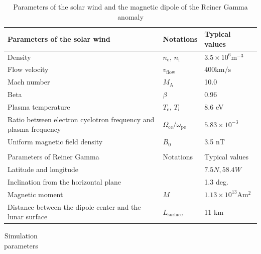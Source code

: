 \documentclass[draft,jgrga]{agutex2015}
\begin{document}
\begin{article}
\begin{table}[h]
\caption{Parameters of the solar wind and the magnetic dipole of the Reiner Gamma anomaly}
\centering
 \begin{tabular}{p{}ll}
 Parameters of the solar wind    &  Notations    &  Typical values \\  \hline           
 Density       & $n_\mathrm{e}$, $n_\mathrm{i}$  &  $3.5 \times 10^6 \mathrm{m^{-3}}$   \\ 
 Flow velocity & $v_\mathrm{flow}$               &  $400  \mathrm{km/s}  $              \\
 Mach number   & $M_\mathrm{A}$                  & 10.0 \\
 Beta          &  $\beta$                        & 0.96 \\
 Plasma temperature & $T_\mathrm{e}$, $T_\mathrm{i}$    &  $8.6$ eV \\
 Ratio between electron cyclotron frequency and plasma frequency & 
  $\Omega_\mathrm{ce}/\omega_\mathrm{pe}$ & $5.83 \times 10^{-3}$ \\ 
 Uniform magnetic field density &  $B_\mathrm{0}$   &   3.5 nT          \\ \hline 
  & & \\ 
 Parameters of Reiner Gamma    &  Notations    &  Typical values \\  \hline           
 Latitude and longitude   &  &  $7.5N, 58.4W$      \\   
 Inclination from the horizontal plane &      &   1.3 deg.         \\            
 Magnetic moment &  $ M $   &  $ 1.13 \times 10^{13} \mathrm{Am^2}$ \\
 Distance between the dipole center and the lunar surface & $L_\mathrm{surface}$ & 11 km \\ \hline
 \end{tabular}
\end{table}
\begin{table}[h]
\caption{
Simulation parameters
}
\centering
 \begin{tabular}{p{}ll}

\end{tabular}
\end{table}
\end{article}
\end{document}
